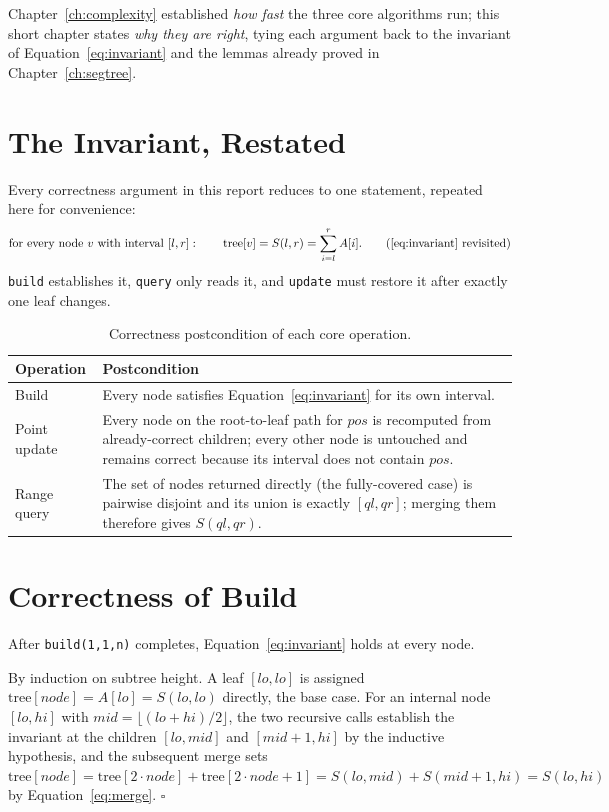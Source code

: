 \documentclass[
  11pt,
  a4paper,
  twoside=false,
  numbers=noenddot,
  headings=big,
  parskip=half,
  toc=bibliography,
  toc=listof,
  bibliography=totoc
]{scrreprt}
\newcounter{lemma}[chapter]
\newenvironment{proof}[1][Proof]{\par\noindent{\bfseries\sffamily\color{navy}#1.}\enspace}{\hfill$\square$\par\medskip}
\newcommand{\tblhead}[1]{\textbf{\sffamily #1}}
\begin{document}
Chapter~\ref{ch:complexity} established \emph{how fast} the three core algorithms run; this short chapter states \emph{why they are right}, tying each argument back to the invariant of Equation~\eqref{eq:invariant} and the lemmas already proved in Chapter~\ref{ch:segtree}.

\section{The Invariant, Restated}
Every correctness argument in this report reduces to one statement, repeated here for convenience:
\begin{equation}
\text{for every node } v \text{ with interval } [l,r]:\qquad \operatorname{tree}[v] = S(l,r) = \sum_{i=l}^{r}A[i].
\tag{\ref{eq:invariant} revisited}
\end{equation}
\texttt{build} establishes it, \texttt{query} only reads it, and \texttt{update} must restore it after exactly one leaf changes.

\begin{table}[H]
\centering
\caption{Correctness postcondition of each core operation.}
\label{tab:invariants}
\begin{tabular}{>{\raggedright\arraybackslash}p{3.0cm}p{9.4cm}}
\toprule
\tblhead{Operation} & \tblhead{Postcondition} \\
\midrule
Build        & Every node satisfies Equation~\eqref{eq:invariant} for its own interval. \\
Point update & Every node on the root-to-leaf path for $pos$ is recomputed from already-correct children; every other node is untouched and remains correct because its interval does not contain $pos$. \\
Range query  & The set of nodes returned directly (the fully-covered case) is pairwise disjoint and its union is exactly $[ql,qr]$; merging them therefore gives $S(ql,qr)$. \\
\bottomrule
\end{tabular}
\end{table}

\section{Correctness of Build}
\begin{thm}\label{thm:build-correct}
After \texttt{build(1,1,n)} completes, Equation~\eqref{eq:invariant} holds at every node.
\end{thm}
\begin{proof}
By induction on subtree height. A leaf $[lo,lo]$ is assigned $\text{tree}[node]=A[lo]=S(lo,lo)$ directly, the base case. For an internal node $[lo,hi]$ with $mid=\lfloor(lo+hi)/2\rfloor$, the two recursive calls establish the invariant at the children $[lo,mid]$ and $[mid+1,hi]$ by the inductive hypothesis, and the subsequent merge sets $\text{tree}[node]=\text{tree}[2\cdot node]+\text{tree}[2\cdot node+1]=S(lo,mid)+S(mid+1,hi)=S(lo,hi)$ by Equation~\eqref{eq:merge}.
\end{proof}
\end{document}
